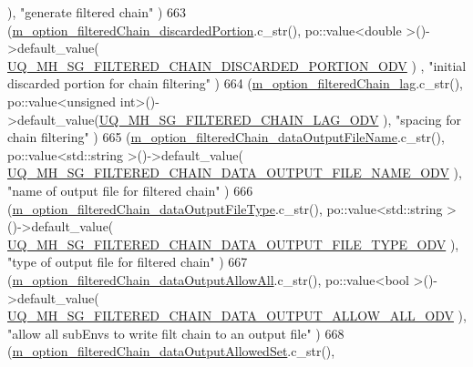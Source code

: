 \begin{DoxyCode}
                          ), \textcolor{stringliteral}{"generate filtered chain"}                                    )
663     (\hyperlink{class_q_u_e_s_o_1_1_metropolis_hastings_s_g_options_a6bc7417585b95eb59cedece39b5d5361}{m\_option\_filteredChain\_discardedPortion}.c\_str(),             
      po::value<double      >()->default\_value(
      \hyperlink{_metropolis_hastings_s_g_options_8h_abac2ddea2dbed40cc772ee1dce223a5f}{UQ\_MH\_SG\_FILTERED\_CHAIN\_DISCARDED\_PORTION\_ODV}                )
      , \textcolor{stringliteral}{"initial discarded portion for chain filtering"}              )
664     (\hyperlink{class_q_u_e_s_o_1_1_metropolis_hastings_s_g_options_aa3e984a031cf626281bccd866e603865}{m\_option\_filteredChain\_lag}.c\_str(),                          
      po::value<unsigned int>()->default\_value(\hyperlink{_metropolis_hastings_s_g_options_8h_a4f771b9dc2dab1a0761823c33d957f76}{UQ\_MH\_SG\_FILTERED\_CHAIN\_LAG\_ODV}                    
                ), \textcolor{stringliteral}{"spacing for chain filtering"}                                )
665     (\hyperlink{class_q_u_e_s_o_1_1_metropolis_hastings_s_g_options_a340a0e9c2b5c2bec86d143cb0f8d64f6}{m\_option\_filteredChain\_dataOutputFileName}.c\_str(),           
      po::value<std::string >()->default\_value(
      \hyperlink{_metropolis_hastings_s_g_options_8h_a6617ee84d21f7980e0e4095e7d3c2d62}{UQ\_MH\_SG\_FILTERED\_CHAIN\_DATA\_OUTPUT\_FILE\_NAME\_ODV}         
         ), \textcolor{stringliteral}{"name of output file for filtered chain"}                     )
666     (\hyperlink{class_q_u_e_s_o_1_1_metropolis_hastings_s_g_options_aca1e9af38b6ef1b83bf1fda6477404c4}{m\_option\_filteredChain\_dataOutputFileType}.c\_str(),           
      po::value<std::string >()->default\_value(
      \hyperlink{_metropolis_hastings_s_g_options_8h_abae51077aec9f525f73d985d3b3e6c27}{UQ\_MH\_SG\_FILTERED\_CHAIN\_DATA\_OUTPUT\_FILE\_TYPE\_ODV}         
         ), \textcolor{stringliteral}{"type of output file for filtered chain"}                     )
667     (\hyperlink{class_q_u_e_s_o_1_1_metropolis_hastings_s_g_options_a7317db52b0866c8895ad1a16d4a4b337}{m\_option\_filteredChain\_dataOutputAllowAll}.c\_str(),           
      po::value<bool        >()->default\_value(
      \hyperlink{_metropolis_hastings_s_g_options_8h_ab91fb04bffb37db43431881b6fdcd33b}{UQ\_MH\_SG\_FILTERED\_CHAIN\_DATA\_OUTPUT\_ALLOW\_ALL\_ODV}         
         ), \textcolor{stringliteral}{"allow all subEnvs to write filt chain to an output file"}    )
668     (\hyperlink{class_q_u_e_s_o_1_1_metropolis_hastings_s_g_options_a361df3110aea27f35465dedac372a90f}{m\_option\_filteredChain\_dataOutputAllowedSet}.c\_str(),       

\end{DoxyCode}
